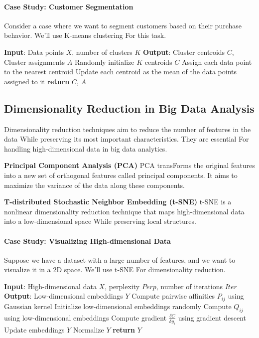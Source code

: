 \documentclass[12pt]{book} %
\begin{document}
\paragraph{Case Study: Customer Segmentation}
Consider a case where we want to segment customers based on their purchase behavior. We'll use K-means clustering For this task.
\FloatBarrier
\begin{algorithm}[H]
\caption{K-means Clustering}\label{alg:kmeans}
\begin{algorithmic}[1]
\State \textbf{Input}: Data points $X$, number of clusters $K$
\State \textbf{Output}: Cluster centroids $C$, Cluster assignments $A$
\State Randomly initialize $K$ centroids $C$
\Repeat
    \State Assign each data point to the nearest centroid
    \State Update each centroid as the mean of the data points assigned to it
\State \textbf{return} $C$, $A$
\end{algorithmic}
\end{algorithm}
\FloatBarrier

\subsection{Dimensionality Reduction in Big Data Analysis}

Dimensionality reduction techniques aim to reduce the number of features in the data While preserving its most important characteristics. They are essential For handling high-dimensional data in big data analytics.

\textbf{Principal Component Analysis (PCA)}
PCA transForms the original features into a new set of orthogonal features called principal components. It aims to maximize the variance of the data along these components.

\textbf{T-distributed Stochastic Neighbor Embedding (t-SNE)}
t-SNE is a nonlinear dimensionality reduction technique that maps high-dimensional data into a low-dimensional space While preserving local structures.

\paragraph{Case Study: Visualizing High-dimensional Data}
Suppose we have a dataset with a large number of features, and we want to visualize it in a 2D space. We'll use t-SNE For dimensionality reduction.
\FloatBarrier
\begin{algorithm}[H]
\caption{t-SNE}\label{alg:tsne}
\begin{algorithmic}[1]
\State \textbf{Input}: High-dimensional data $X$, perplexity $Perp$, number of iterations $Iter$
\State \textbf{Output}: Low-dimensional embeddings $Y$
\State Compute pairwise affinities $P_{ij}$ using Gaussian kernel
\State Initialize low-dimensional embeddings randomly
    \State Compute $Q_{ij}$ using low-dimensional embeddings
    \State Compute gradient $\frac{\delta C}{\delta y_i}$ using gradient descent
    \State Update embeddings $Y$
    \State Normalize $Y$
\EndFor
\State \textbf{return} $Y$
\end{algorithmic}
\end{algorithm}
\FloatBarrier
\end{document}
